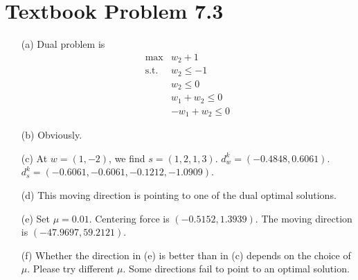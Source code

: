 \documentclass[11pt]{article}
\begin{document}
\section*{Textbook Problem 7.3}
\begin{itemize}
  \item[(a)] Dual problem is
  \begin{equation*}
    \begin{array}{rl}
      \max & w_2+1 \\
      \text{s.t.} & w_2\leq -1 \\
      & w_2 \leq 0 \\
      & w_1+w_2\leq 0 \\
      & -w_1+w_2\leq 0
    \end{array}
  \end{equation*}
  \item[(b)] Obviously.
  \item[(c)] At $w=(1,-2)$, we find $s=(1,2,1,3)$. $d^k_w=(-0.4848,0.6061)$. $d^k_s=(-0.6061,-0.6061,-0.1212,-1.0909)$.
  \item[(d)] This moving direction is pointing to one of the dual optimal solutions.
  \item[(e)] Set $\mu=0.01$. Centering force is $(-0.5152,1.3939)$. The moving direction is $(-47.9697,59.2121)$.
  \item[(f)] Whether the direction in (e) is better than in (c) depends on the choice of $\mu$. Please try different $\mu$. Some directions fail to point to an optimal solution.
\end{itemize}
\end{document}
